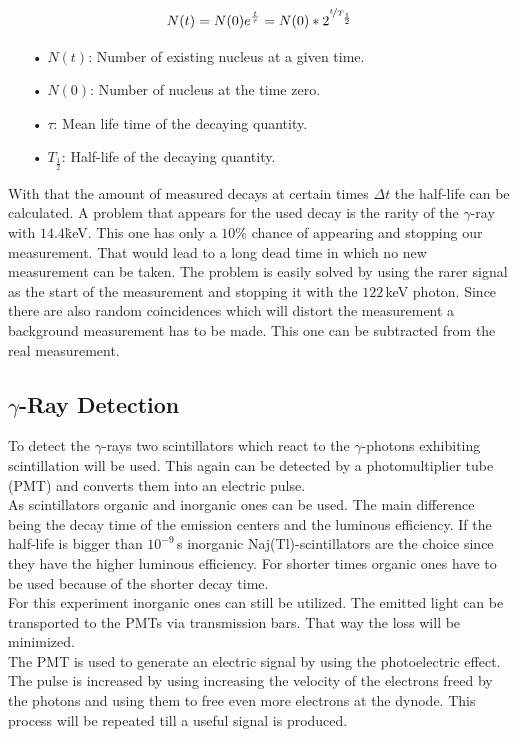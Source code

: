 \documentclass[30pt,a4paper]{article}
\begin{document}
 	\begin{equation}
 		N(t)=N(0) e^{\frac{t}{\tau}}=N(0) *2^{\nicefrac{t}{T_\frac{1}{2}}}
 		\label{eq1}
 	\end{equation}
 	\begin{enumerate}
 		\item[•] $N(t)$: Number of existing nucleus at a given time.
 		\item[•] $N(0)$: Number of nucleus at the time zero.
 		\item[•] $\tau$: Mean life time of the decaying quantity.
 		\item[•] $T_\frac{1}{2}$: Half-life of the decaying quantity.
 	\end{enumerate}
	With that the amount of measured decays at certain times $\Delta t$ the half-life can be calculated. A problem that appears for the used decay is the rarity of the $\gamma$-ray with $14.4$\.keV. This one has only a $10\%$ chance of appearing and stopping our measurement. That would lead to a long dead time in which no new measurement can be taken. The problem is easily solved by using the rarer signal as the start of the measurement and stopping it with the $122$\,keV photon. Since there are also random coincidences which will distort the measurement a background measurement has to be made. This one can be subtracted from the real measurement.
 	
 	\subsection{$\gamma$-Ray Detection}
 	To detect the $\gamma$-rays two scintillators which react to the $\gamma$-photons exhibiting scintillation will be used. This again can be detected by a photomultiplier tube (PMT) and converts them into an electric pulse.\\
 	As scintillators organic and inorganic ones can be used. The main difference being the decay time of the emission centers and the luminous efficiency. If the half-life is bigger than $10^{-9}$\,s inorganic Naj(Tl)-scintillators are the choice since they have the higher luminous efficiency. For shorter times organic ones have to be used because of the shorter decay time.\\ For this experiment inorganic ones can still be utilized. The emitted light can be transported to the PMTs via transmission bars. That way the loss will be minimized. \\ The PMT is used to generate an electric signal by using the photoelectric effect. The pulse is increased by using increasing the velocity of the electrons freed by the photons and using them to free even more electrons at the dynode. This process will be repeated till a useful signal is produced.
\end{document}
